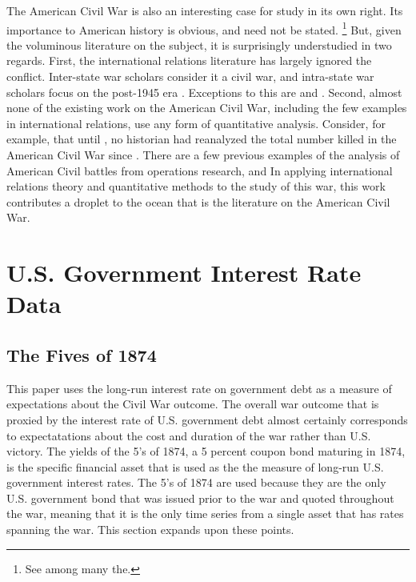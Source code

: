 The American Civil War is also an interesting case for study in its own right.
Its importance to American history is obvious, and need not be stated.%
\footnote{See \textcite{McPherson2003} among many the.}
But, given the voluminous literature on the subject, it is surprisingly understudied in two regards. %
First, the international relations literature has largely ignored the conflict.
Inter-state war scholars consider it a civil war, and intra-state war scholars focus on the post-1945 era \parencites[140-141]{Reiter2009}[2]{Poast2012}. %
Exceptions to this are \textcite{Reiter2009} and \textcite{Poast2012}.
Second, almost none of the existing work on the American Civil War, including the few examples in international relations, use any form of quantitative analysis.%
Consider, for example, that until \textcite{hacker2011census}, no historian had reanalyzed the total number killed in the American Civil War since \textcite{Livermore1900}.
There are a few previous examples of the analysis of American Civil battles from operations research, \textcite{Weiss1966} and
In applying international relations theory and quantitative methods to the study of this war, this work contributes a droplet to the ocean that is the literature on the American Civil War.



\section{U.S. Government Interest Rate Data}
\label{bonds_battles:sec:why-prices-study}



\subsection{The Fives of 1874}
\label{bonds_battles:sec:5s-1874}

This paper uses the long-run interest rate on government debt as a measure of expectations about the Civil War outcome.
The overall war outcome that is proxied by the interest rate of U.S. government debt almost certainly corresponds to expectatations about the cost and duration of the war rather than U.S. victory.
The yields of the 5's of 1874, a 5 percent coupon bond maturing in 1874, is the specific financial asset that is used as the the measure of long-run U.S. government interest rates.
The 5's of 1874 are used because they are the only U.S. government bond that was issued prior to the war and quoted throughout the war, meaning that it is the only time series from a single asset that has rates spanning the war.
This section expands upon these points.


